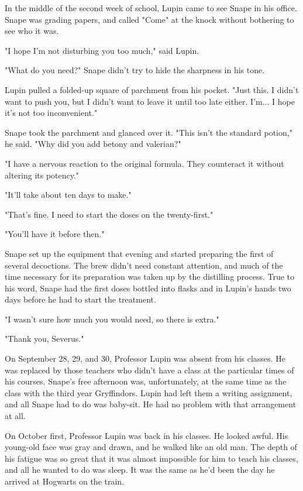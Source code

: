 In the middle of the second week of school, Lupin came to see Snape in his office. Snape was grading papers, and called "Come" at the knock without bothering to see who it was.

"I hope I'm not disturbing you too much," said Lupin.

"What do you need?" Snape didn't try to hide the sharpness in his tone.

Lupin pulled a folded-up square of parchment from his pocket. "Just this. I didn't want to push you, but I didn't want to leave it until too late either. I'm... I hope it's not too inconvenient."

Snape took the parchment and glanced over it. "This isn't the standard potion," he said. "Why did you add betony and valerian?"

"I have a nervous reaction to the original formula. They counteract it without altering its potency."

"It'll take about ten days to make."

"That's fine. I need to start the doses on the twenty-first."

"You'll have it before then."

Snape set up the equipment that evening and started preparing the first of several decoctions. The brew didn't need constant attention, and much of the time necessary for its preparation was taken up by the distilling process. True to his word, Snape had the first doses bottled into flasks and in Lupin's hands two days before he had to start the treatment.

"I wasn't sure how much you would need, so there is extra."

"Thank you, Severus."

On September 28, 29, and 30, Professor Lupin was absent from his classes. He was replaced by those teachers who didn't have a class at the particular times of his courses. Snape's free afternoon was, unfortunately, at the same time as the class with the third year Gryffindors. Lupin had left them a writing assignment, and all Snape had to do was baby-sit. He had no problem with that arrangement at all.

On October first, Professor Lupin was back in his classes. He looked awful. His young-old face was gray and drawn, and he walked like an old man. The depth of his fatigue was so great that it was almost impossible for him to teach his classes, and all he wanted to do was sleep. It was the same as he'd been the day he arrived at Hogwarts on the train.

